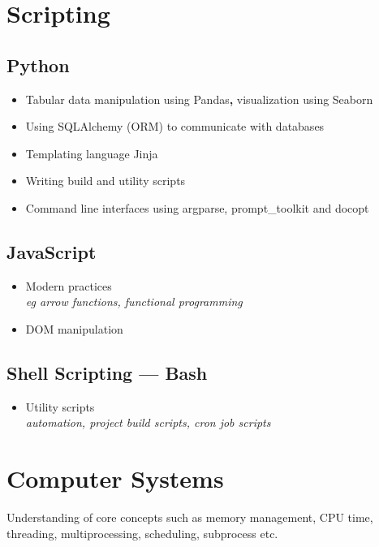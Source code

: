 \documentclass[a4paper, 13pt, draft]{article}
\newcommand{\proglang}[1]{%
    \subsection*{#1}
}
\begin{document}
\pagebreak

\section*{\color{col1} \Large{Scripting} \color{default}}

\proglang{Python}

\begin{itemize}
    \setlength\itemsep{0em}
\item
    Tabular data manipulation using Pandas\textbf{,} visualization using
    Seaborn
\item
    Using SQLAlchemy (ORM) to communicate with databases
\item
    Templating language Jinja
\item
    Writing build and utility scripts
\item
    Command line interfaces using argparse, prompt\_toolkit and docopt \\
\end{itemize}

\begin{multicols}{2}

    \proglang{JavaScript} 

    \begin{itemize}
	\setlength\itemsep{0em}
    \item Modern practices \\ 
	\textit{eg arrow functions, functional programming}
    \item DOM manipulation 
\end{itemize}

\proglang{Shell Scripting --- Bash}

\begin{itemize}		
    \item Utility scripts \\ 
    \textit{automation, project build scripts, cron job scripts}
\end{itemize}		

\end{multicols}

\section*{\color{col1} \Large{Computer Systems} \color{default}}

Understanding of core concepts such as memory management, CPU time,
threading, multiprocessing, scheduling, subprocess etc.
\end{document}
